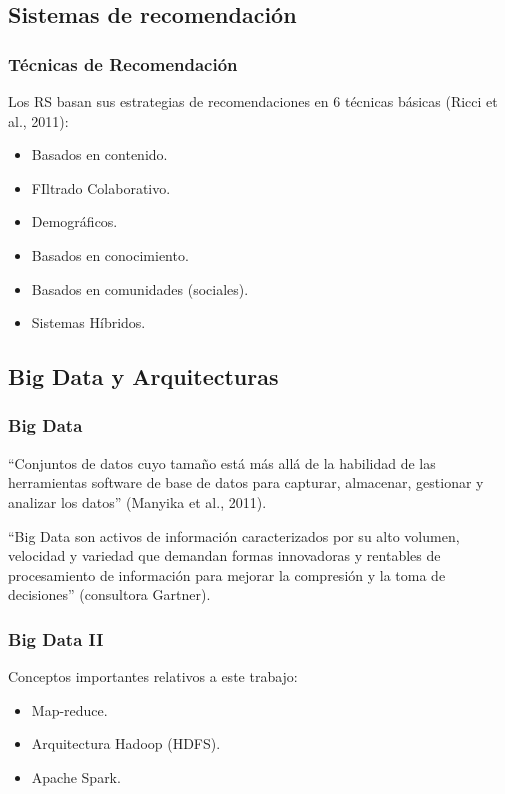 \subsection{Sistemas de recomendación}
\begin{frame}
	\frametitle{Técnicas de Recomendación}
	Los RS basan sus estrategias de recomendaciones en 6 técnicas básicas (Ricci et al., 2011):
	\bigskip
	\begin{itemize} [<+>]
		\item Basados en contenido.
		\item FIltrado Colaborativo.
		\item Demográficos.
		\item Basados en conocimiento.
		\item Basados en comunidades (sociales).
		\item Sistemas Híbridos.
	\end{itemize}
\end{frame}

\subsection{Big Data y Arquitecturas}
\begin{frame}[allowframebreaks]
	\frametitle{Big Data}
	\begin{tcolorbox}[colback=blue!5,colframe=blue!40!black,title=Big Data]
		``Conjuntos de datos cuyo tamaño está más allá de la habilidad de las herramientas software de base de datos para capturar, almacenar, gestionar y analizar los datos'' (Manyika et al., 2011).

		\bigskip

		``Big Data son activos de información caracterizados por su alto volumen, velocidad y variedad que demandan formas innovadoras y rentables de procesamiento de información para mejorar la compresión y la toma de decisiones'' (consultora Gartner).
	\end{tcolorbox}
\end{frame}

\begin{frame}
	\frametitle{Big Data II}
	Conceptos importantes relativos a este trabajo:
	\bigskip

	\begin{itemize}
		\item Map-reduce.
		\item Arquitectura Hadoop (HDFS).
		\item Apache Spark.
	\end{itemize}
\end{frame}

